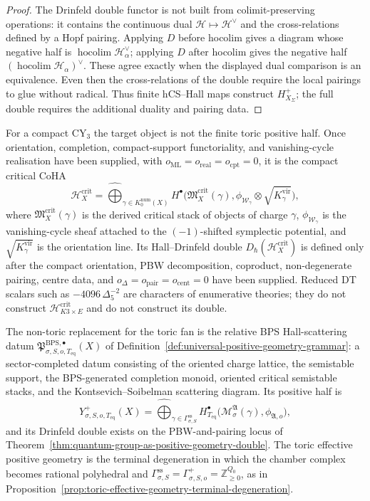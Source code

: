 \begin{proof}
The Drinfeld double functor is not built from colimit-preserving
operations: it contains the continuous dual
$\mathcal{H}\mapsto\mathcal{H}^{\vee}$ and the cross-relations defined
by a Hopf pairing. Applying $D$ before hocolim gives a diagram whose
negative half is $\operatorname{hocolim}\mathcal{H}_\alpha^\vee$;
applying $D$ after hocolim gives the negative half
$(\operatorname{hocolim}\mathcal{H}_\alpha)^\vee$. These agree exactly
when the displayed dual comparison is an equivalence. Even then the
cross-relations of the double require the local pairings to glue
without radical. Thus finite hCS--Hall maps construct
$H^+_{X_\Sigma}$; the full double requires the additional duality and
pairing data.
\end{proof}

For a compact CY$_3$ the target object is not the finite toric
positive half. Once orientation, completion, compact-support
functoriality, and vanishing-cycle realisation have been supplied, with
$o_{\mathrm{ML}}=o_{\mathrm{real}}=o_{\mathrm{cpt}}=0$, it is the
compact critical CoHA
\[
 \mathcal{H}^{\mathrm{crit}}_X
 =
 \widehat{\bigoplus}_{\gamma\in K_0^{\mathrm{num}}(X)}
 H^\bullet\bigl(
 \mathfrak{M}^{\mathrm{crit}}_X(\gamma),
 \phi_{\mathcal{W}_\gamma}\otimes\sqrt{K^{\mathrm{vir}}_\gamma}
 \bigr),
\]
where $\mathfrak{M}^{\mathrm{crit}}_X(\gamma)$ is the derived critical
stack of objects of charge $\gamma$, $\phi_{\mathcal{W}_\gamma}$ is
the vanishing-cycle sheaf attached to the $(-1)$-shifted symplectic
potential, and $\sqrt{K^{\mathrm{vir}}_\gamma}$ is the orientation
line. Its Hall--Drinfeld double
$D_\hbar(\mathcal{H}^{\mathrm{crit}}_X)$ is defined only after the
compact orientation, PBW decomposition, coproduct, non-degenerate
pairing, centre data, and
$o_\Delta=o_{\mathrm{pair}}=o_{\mathrm{cent}}=0$ have been supplied.
Reduced DT scalars such as
$-4096\,\Delta_5^{-2}$ are characters of enumerative theories; they do
not construct $\mathcal{H}^{\mathrm{crit}}_{K3\times E}$ and do not
construct its double.

The non-toric replacement for the toric fan is the relative BPS
Hall-scattering datum
\(\mathfrak{P}^{\mathrm{BPS},\bullet}_{\sigma,S,o,T_{\mathrm{eq}}}(X)\)
of Definition~\ref{def:universal-positive-geometry-grammar}: a
sector-completed datum consisting of the oriented charge lattice, the
semistable support, the BPS-generated completion monoid, oriented
critical semistable stacks, and the Kontsevich--Soibelman scattering
diagram. Its positive half is
\[
 Y^+_{\sigma,S,o,T_{\mathrm{eq}}}(X)
 =
 \widehat{\bigoplus}_{\gamma\in\Gamma^{\mathrm{ss}}_{\sigma,S}}
 H^\bullet_{T_{\mathrm{eq}}}
 \bigl(\mathcal{M}^{\mathfrak A}_\sigma(\gamma),
 \phi_{\mathfrak A,o}\bigr),
\]
and its Drinfeld double exists on the PBW-and-pairing locus of
Theorem~\ref{thm:quantum-group-as-positive-geometry-double}. The toric
effective positive geometry is the terminal degeneration in which the
chamber complex becomes rational polyhedral and
\(\Gamma^{\mathrm{ss}}_{\sigma,S}
=\Gamma^+_{\sigma,S,o}=\mathbb{Z}_{\geq0}^{Q_0}\), as in
Proposition~\ref{prop:toric-effective-geometry-terminal-degeneration}.

